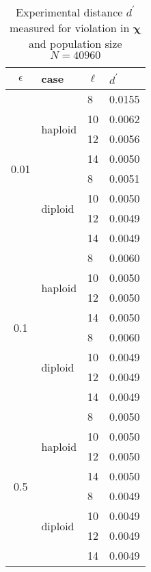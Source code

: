 \begin{table}[ht]
\caption{Experimental distance $d^\prime$ measured for violation in $\bm{\chi}$ and population size $N = 40960$ }
\centering
\begin{tabularx}{0.75\textwidth}{ c *{3}{X}}
\toprule
$\epsilon$ & case & $\ell$ & $d^\prime$ \\
\midrule
\multirow{8}{*}{0.01} & \multirow{4}{*}{haploid} 	& 8 & 0.0155 \\
		      &   				& 10 & 0.0062 \\ 
		      & 			 	& 12 & 0.0056 \\
		      &  	 			& 14 & 0.0050 \\ 
		      \cmidrule(l){2-4}
		      & \multirow{4}{*}{diploid} 	& 8 & 0.0051 \\
		      &  	 			& 10 & 0.0050 \\
		      & 			 	& 12 & 0.0049 \\
		      &  	 			& 14 & 0.0049 \\
		      \midrule
\multirow{8}{*}{0.1} & \multirow{4}{*}{haploid} 	& 8 & 0.0060 \\
		      &   				& 10 & 0.0050 \\	
		      & 				& 12 & 0.0050 \\	
		      &  	 			& 14 & 0.0050 \\
		      \cmidrule(l){2-4}
		      & \multirow{4}{*}{diploid} 	& 8 & 0.0060 \\
		      &  	 			& 10 & 0.0049 \\
		      & 				& 12 & 0.0049 \\
		      &  	 			& 14 & 0.0049 \\
		      \midrule
\multirow{8}{*}{0.5} & \multirow{4}{*}{haploid} 	& 8 & 0.0050 \\
		      &   				& 10 & 0.0050 \\
		      & 				& 12 & 0.0050 \\
		      &  	 			& 14 & 0.0050 \\
		      \cmidrule(l){2-4}
		      & \multirow{4}{*}{diploid} 	& 8 & 0.0049 \\	
		      &  	 			& 10 & 0.0049 \\
		      &  				& 12 & 0.0049 \\
		      &  	 			& 14 & 0.0049 \\
\bottomrule
\end{tabularx}
\label{ditanceChi40960}
\end{table} 



